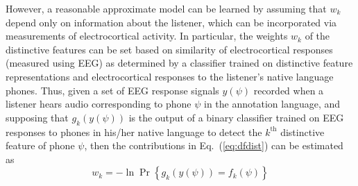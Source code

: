 However, a reasonable approximate model can be learned by assuming
that $w_k$ depend only on information about the listener, which can be
incorporated via measurements of electrocortical activity. In
particular, the weights $w_k$ of the distinctive features can be set
based on similarity of electrocortical responses (measured using EEG)
as determined by a classifier trained on distinctive feature
representations and electrocortical responses to the listener's native
language phones. Thus, given a set of EEG response signals $y(\psi)$
recorded when a listener hears audio corresponding to phone $\psi$ in
the annotation language, and supposing that $g_k(y(\psi))$ is the
output of a binary classifier trained on EEG responses to phones in
his/her native language to detect the $k^{\textrm{th}}$ distinctive
feature of phone $\psi$\cite{Liberto15}, then the contributions in
Eq.~(\ref{eq:dfdist}) can be estimated as
\begin{equation}
  w_k = -\ln\Pr\left\{g_k(y(\psi))= f_k(\psi)\right\}
  \label{eq:eegdist}
\end{equation}
